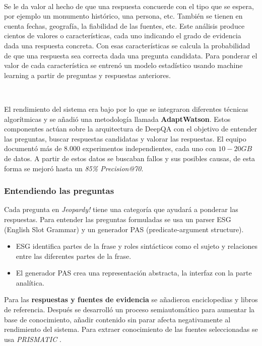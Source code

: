 \documentclass[paper=a4, fontsize=10pt]{scrartcl} %
\numberwithin{equation}{section} %
\numberwithin{figure}{section} %
\numberwithin{table}{section} %
\begin{document}
\

Se le da valor al hecho de que una respuesta concuerde con el tipo que se espera, por ejemplo un monumento histórico, una persona, etc.
También se tienen en cuenta fechas, geografía, la fiabilidad de las fuentes, etc.
Este análisis produce cientos de valores o características, cada uno indicando el grado de evidencia dada una respuesta concreta.
Con esas características se calcula la probabilidad de que una respuesta sea correcta dada una pregunta candidata.
Para ponderar el valor de cada característica se entrenó un modelo estadístico usando machine learning a partir de preguntas y respuestas anteriores.

\

El rendimiento del sistema era bajo por lo que se integraron diferentes técnicas algorítmicas y se añadió una metodología llamada \textbf{AdaptWatson}.
Estos componentes actúan sobre la arquitectura de DeepQA con el objetivo de entender las preguntas, buscar respuestas candidatas y valorar las respuestas.
El equipo documentó más de $8.000$ experimentos independientes, cada uno con $10-20GB$ de datos.
A partir de estos datos se buscaban fallos y sus posibles causas, de esta forma se mejoró hasta un \textit{85\% Precision@70}.

\subsubsection{Entendiendo las preguntas}
Cada pregunta en \textit{Jeopardy!} tiene una categoría que ayudará a ponderar las respuestas. %
Para entender las preguntas formuladas se usa un parser ESG (English Slot Grammar) %
y un generador PAS (predicate-argument structure). 

\begin{itemize}
	\item ESG identifica partes de la frase y roles sintácticos como el sujeto y relaciones entre las diferentes partes de la frase.
	\item El generador PAS crea una representación abstracta, la interfaz con la parte analítica.
\end{itemize}

Para las \textbf{respuestas y fuentes de evidencia} se añadieron enciclopedias y libros de referencia. Después se desarrolló un proceso semiautomático para aumentar la base de conocimiento, añadir contenido sin parar afecta negativamente al rendimiento del sistema.
Para extraer conocimiento de las fuentes seleccionadas se usa \textit{PRISMATIC} \cite{prismatic}. %
\end{document}
